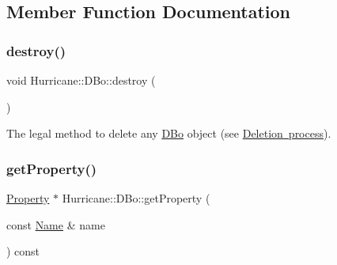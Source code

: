 \subsection{Member Function Documentation}
\mbox{\label{classHurricane_1_1DBo_a67febf5bf9c8b322674648688639728b}} 
\subsubsection{\texorpdfstring{destroy()}{destroy()}}
{\footnotesize\ttfamily void Hurricane\+::\+D\+Bo\+::destroy (\begin{DoxyParamCaption}{ }\end{DoxyParamCaption})\hspace{0.3cm}{\ttfamily [virtual]}}

The legal method to delete any \mbox{\hyperlink{classHurricane_1_1DBo}{D\+Bo}} object (see \mbox{\hyperlink{classHurricane_1_1DBo_sDBodestroy}{Deletion process}}). \mbox{\label{classHurricane_1_1DBo_a599f61978df51d1d4c351f6cbd02488d}} 
\subsubsection{\texorpdfstring{get\+Property()}{getProperty()}}
{\footnotesize\ttfamily \mbox{\hyperlink{classHurricane_1_1Property}{Property}} $\ast$ Hurricane\+::\+D\+Bo\+::get\+Property (\begin{DoxyParamCaption}\item[{const \mbox{\hyperlink{classHurricane_1_1Name}{Name}} \&}]{name }\end{DoxyParamCaption}) const}


